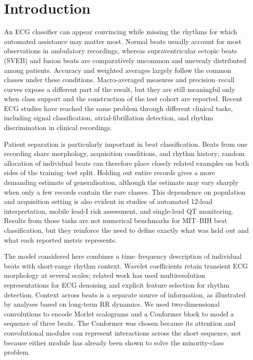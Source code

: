 \section{Introduction}

An ECG classifier can appear convincing while missing the rhythms for which automated assistance may matter most. Normal beats usually account for most observations in ambulatory recordings, whereas supraventricular ectopic beats (SVEB) and fusion beats are comparatively uncommon and unevenly distributed among patients. Accuracy and weighted averages largely follow the common classes under these conditions. Macro-averaged measures and precision--recall curves expose a different part of the result, but they are still meaningful only when class support and the construction of the test cohort are reported\cite{he2009learning,saito2015precision}. Recent ECG studies have reached the same problem through different clinical tasks, including signal classification, atrial-fibrillation detection, and rhythm discrimination in clinical recordings\cite{mantravadi2024clinet,petmezas2026optimizing,vainoryte2025diagnostic}.

Patient separation is particularly important in beat classification. Beats from one recording share morphology, acquisition conditions, and rhythm history; random allocation of individual beats can therefore place closely related examples on both sides of the training--test split. Holding out entire records gives a more demanding estimate of generalisation, although the estimate may vary sharply when only a few records contain the rare classes\cite{dechazal2004automatic}. This dependence on population and acquisition setting is also evident in studies of automated 12-lead interpretation, mobile lead-I risk assessment, and single-lead QT monitoring\cite{herman2024validation,tuboly2026malignant,doggart2025singlelead}. Results from those tasks are not numerical benchmarks for MIT--BIH beat classification, but they reinforce the need to define exactly what was held out and what each reported metric represents.

The model considered here combines a time--frequency description of individual beats with short-range rhythm context. Wavelet coefficients retain transient ECG morphology at several scales\cite{addison2005wavelet,torrence1998practical,mallat1989wavelet}; related work has used multiresolution representations for ECG denoising and explicit feature selection for rhythm detection\cite{wang2025mrsenet,petmezas2026optimizing}. Context across beats is a separate source of information, as illustrated by analyses based on long-term RR dynamics\cite{pukkila2026chronic}. We used two-dimensional convolutions to encode Morlet scalograms and a Conformer block to model a sequence of three beats\cite{gulati2020conformer}. The Conformer was chosen because its attention and convolutional modules can represent interactions across the short sequence, not because either module has already been shown to solve the minority-class problem.
